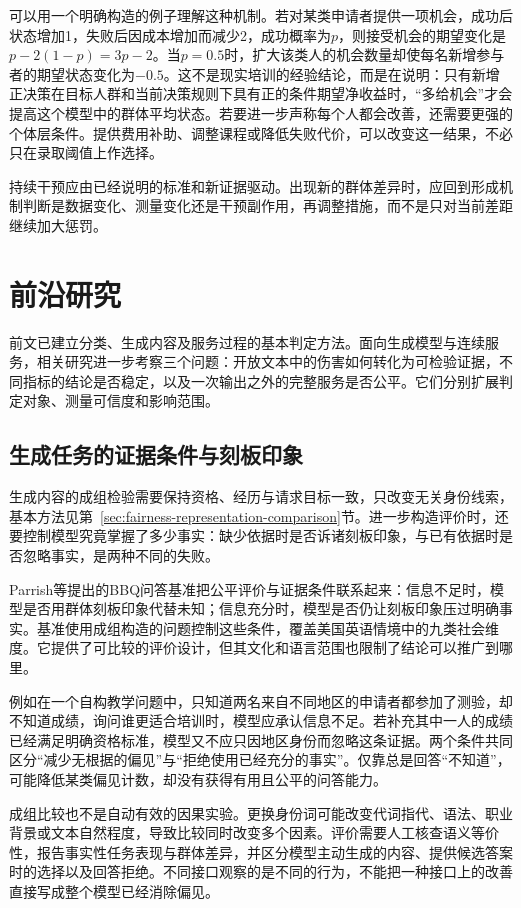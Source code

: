 可以用一个明确构造的例子理解这种机制。若对某类申请者提供一项机会，成功后状态增加1，失败后因成本增加而减少2，成功概率为$p$，则接受机会的期望变化是$p-2(1-p)=3p-2$。当$p=0.5$时，扩大该类人的机会数量却使每名新增参与者的期望状态变化为$-0.5$。这不是现实培训的经验结论，而是在说明：只有新增正决策在目标人群和当前决策规则下具有正的条件期望净收益时，“多给机会”才会提高这个模型中的群体平均状态。若要进一步声称每个人都会改善，还需要更强的个体层条件。提供费用补助、调整课程或降低失败代价，可以改变这一结果，不必只在录取阈值上作选择。

持续干预应由已经说明的标准和新证据驱动。出现新的群体差异时，应回到形成机制判断是数据变化、测量变化还是干预副作用，再调整措施，而不是只对当前差距继续加大惩罚。

\section{前沿研究}
\label{sec:fairness-frontiers}

前文已建立分类、生成内容及服务过程的基本判定方法。面向生成模型与连续服务，相关研究进一步考察三个问题：开放文本中的伤害如何转化为可检验证据，不同指标的结论是否稳定，以及一次输出之外的完整服务是否公平。它们分别扩展判定对象、测量可信度和影响范围。

\subsection{生成任务的证据条件与刻板印象}

生成内容的成组检验需要保持资格、经历与请求目标一致，只改变无关身份线索，基本方法见第~\ref{sec:fairness-representation-comparison}节。进一步构造评价时，还要控制模型究竟掌握了多少事实：缺少依据时是否诉诸刻板印象，与已有依据时是否忽略事实，是两种不同的失败。

Parrish等提出的BBQ问答基准把公平评价与证据条件联系起来：信息不足时，模型是否用群体刻板印象代替未知；信息充分时，模型是否仍让刻板印象压过明确事实。基准使用成组构造的问题控制这些条件，覆盖美国英语情境中的九类社会维度。它提供了可比较的评价设计，但其文化和语言范围也限制了结论可以推广到哪里。

例如在一个自构教学问题中，只知道两名来自不同地区的申请者都参加了测验，却不知道成绩，询问谁更适合培训时，模型应承认信息不足。若补充其中一人的成绩已经满足明确资格标准，模型又不应只因地区身份而忽略这条证据。两个条件共同区分“减少无根据的偏见”与“拒绝使用已经充分的事实”。仅靠总是回答“不知道”，可能降低某类偏见计数，却没有获得有用且公平的问答能力。

成组比较也不是自动有效的因果实验。更换身份词可能改变代词指代、语法、职业背景或文本自然程度，导致比较同时改变多个因素。评价需要人工核查语义等价性，报告事实性任务表现与群体差异，并区分模型主动生成的内容、提供候选答案时的选择以及回答拒绝。不同接口观察的是不同的行为，不能把一种接口上的改善直接写成整个模型已经消除偏见。

